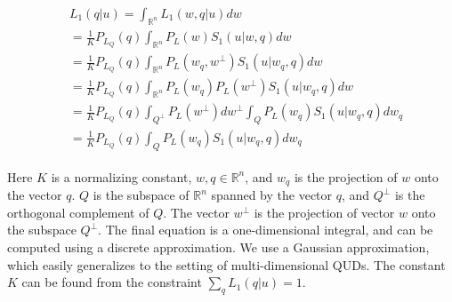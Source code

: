 \documentclass[9pt,twocolumn,twoside,lineno]{pnas-new}
\begin{document}
{	%






















	 \begin{align}
	 \begin{split}
	&L_1(q | u) = \int_{\mathbb{R}^n}L_1(w,q | u) dw \\
	&= \frac{1}{K}P_{L_Q}(q) \int_{\mathbb{R}^n}P_L(w)S_1(u|w,q) dw \\
	&= \frac{1}{K}P_{L_Q}(q) \int_{\mathbb{R}^n}P_L(w_q, w^\bot)S_1(u|w_q,q) dw \\
	&= \frac{1}{K}P_{L_Q}(q) \int_{\mathbb{R}^n}P_L(w_q) P_L(w^\bot)S_1(u|w_q,q) dw \\
	&= \frac{1}{K}P_{L_Q}(q) \int_{Q^\bot}P_L(w^\bot) dw^\bot \int_{Q}P_L(w_q) S_1(u|w_q,q) dw_q \\
	&= \frac{1}{K}P_{L_Q}(q)  \int_{Q}P_L(w_q) S_1(u|w_q,q) dw_q\nonumber
	\end{split}
	 \end{align}
	



	Here $K$ is a normalizing constant, $w, q\in \mathbb{R}^n$, and $w_q$ is the projection of $w$ onto the vector $q$. $Q$ is the subspace of $\mathbb{R}^n$ spanned by the vector $q$, and $Q^\bot$ is the orthogonal complement of $Q$. 
	The vector $w^\bot$ is the projection of vector $w$ onto the subspace $Q^\bot$. The final equation is a one-dimensional integral, and can be computed using a discrete approximation. We use a Gaussian approximation, which easily generalizes to the setting of multi-dimensional QUDs. The constant $K$ can be found from the constraint $\sum_q L_1(q|u) = 1$.

}
\end{document}
